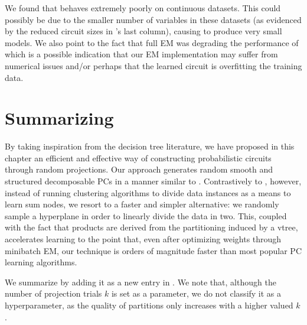 We found that  behaves extremely poorly on continuous datasets. This could
possibly be due to the smaller number of variables in these datasets (as evidenced by the reduced
circuit sizes in 's last column), causing  to produce very small
models. We also point to the fact that full EM was degrading the performance of 
which is a possible indication that our EM implementation may suffer from numerical issues and/or
perhaps that the learned circuit is overfitting the training data.

\section{Summarizing }

By taking inspiration from the decision tree literature, we have proposed in this chapter an
efficient and effective way of constructing probabilistic circuits through random projections. Our
approach generates random smooth and structured decomposable PCs in a manner similar to
. Contrastively to , however, instead of running clustering
algorithms to divide data instances as a means to learn sum nodes, we resort to a faster and
simpler alternative: we randomly sample a hyperplane in order to linearly divide the data in two.
This, coupled with the fact that products are derived from the partitioning induced by a vtree,
accelerates learning to the point that, even after optimizing weights through minibatch EM, our
technique is orders of magnitude faster than most popular PC learning algorithms.

We summarize  by adding it as a new entry in . We note
that, although the number of projection trials $k$ is set as a parameter, we do not classify it as
a hyperparameter, as the quality of partitions only increases with a higher valued $k$.

